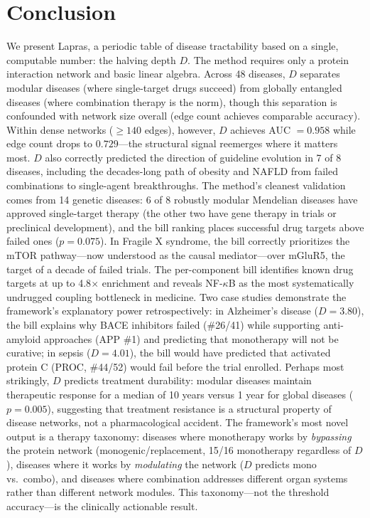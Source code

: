 \documentclass[11pt,a4paper]{article}
\begin{document}
\section{Conclusion}

We present Lapras, a periodic table of disease tractability based on a single, computable number: the halving depth $D$. The method requires only a protein interaction network and basic linear algebra. Across 48 diseases, $D$ separates modular diseases (where single-target drugs succeed) from globally entangled diseases (where combination therapy is the norm), though this separation is confounded with network size overall (edge count achieves comparable accuracy). Within dense networks ($\geq 140$ edges), however, $D$ achieves AUC $= 0.958$ while edge count drops to $0.729$---the structural signal reemerges where it matters most. $D$ also correctly predicted the direction of guideline evolution in 7 of 8 diseases, including the decades-long path of obesity and NAFLD from failed combinations to single-agent breakthroughs. The method's cleanest validation comes from 14 genetic diseases: 6 of 8 robustly modular Mendelian diseases have approved single-target therapy (the other two have gene therapy in trials or preclinical development), and the bill ranking places successful drug targets above failed ones ($p = 0.075$). In Fragile X syndrome, the bill correctly prioritizes the mTOR pathway---now understood as the causal mediator---over mGluR5, the target of a decade of failed trials. The per-component bill identifies known drug targets at up to 4.8$\times$ enrichment and reveals NF-$\kappa$B as the most systematically undrugged coupling bottleneck in medicine. Two case studies demonstrate the framework's explanatory power retrospectively: in Alzheimer's disease ($D = 3.80$), the bill explains why BACE inhibitors failed (\#26/41) while supporting anti-amyloid approaches (APP \#1) and predicting that monotherapy will not be curative; in sepsis ($D = 4.01$), the bill would have predicted that activated protein C (PROC, \#44/52) would fail before the trial enrolled. Perhaps most strikingly, $D$ predicts treatment durability: modular diseases maintain therapeutic response for a median of 10 years versus 1 year for global diseases ($p = 0.005$), suggesting that treatment resistance is a structural property of disease networks, not a pharmacological accident. The framework's most novel output is a therapy taxonomy: diseases where monotherapy works by \emph{bypassing} the protein network (monogenic/replacement, 15/16 monotherapy regardless of $D$), diseases where it works by \emph{modulating} the network ($D$ predicts mono vs.\ combo), and diseases where combination addresses different organ systems rather than different network modules. This taxonomy---not the threshold accuracy---is the clinically actionable result.
\end{document}
